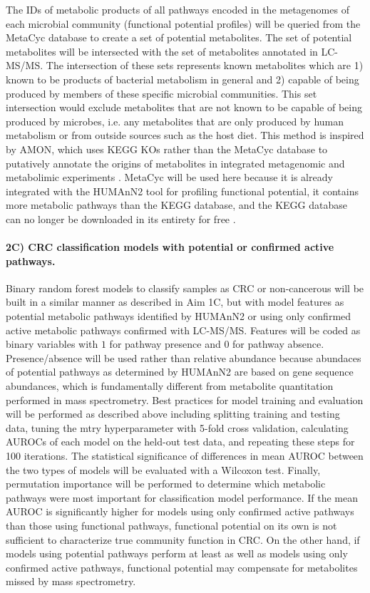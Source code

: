 \documentclass[11pt]{article}
\begin{document}
The IDs of metabolic products of all pathways encoded in the metagenomes of each microbial community (functional potential profiles) will be queried from the MetaCyc database to create a set of potential metabolites.
The set of potential metabolites will be intersected with the set of metabolites annotated in LC-MS/MS.
The intersection of these sets represents known metabolites which are 1) known to be products of bacterial metabolism in general and 2) capable of being produced by members of these specific microbial communities.
This set intersection would exclude metabolites that are not known to be capable of being produced by microbes, i.e. any metabolites that are only produced by human metabolism or from outside sources such as the host diet.
This method is inspired by AMON, which uses KEGG KOs rather than the MetaCyc database to putatively annotate the origins of metabolites in integrated metagenomic and metabolimic experiments \cite{shaffer_amon_2019}.
MetaCyc will be used here because it is already integrated with the HUMAnN2 tool for profiling functional potential,
it contains more metabolic pathways than the KEGG database,
and the KEGG database can no longer be downloaded in its entirety for free \cite{caspi_metacyc_2020}.

\paragraph{2C) CRC classification models with potential or confirmed active pathways.}

Binary random forest models to classify samples as CRC or non-cancerous will be built in a similar manner as described in Aim 1C, but with model features as potential metabolic pathways identified by HUMAnN2 or using only confirmed active metabolic pathways confirmed with LC-MS/MS.
Features will be coded as binary variables with $1$ for pathway presence and $0$ for pathway absence.
Presence/absence will be used rather than relative abundance because abundaces of potential pathways as determined by HUMAnN2 are based on gene sequence abundances, which is fundamentally different from metabolite quantitation performed in mass spectrometry.
Best practices for model training and evaluation will be performed as described above including splitting training and testing data, tuning the mtry hyperparameter with 5-fold cross validation, calculating AUROCs of each model on the held-out test data, and repeating these steps for 100 iterations.
The statistical significance of differences in mean AUROC between the two types of models will be evaluated with a Wilcoxon test.
Finally, permutation importance will be performed to determine which metabolic pathways were most important for classification model performance.
If the mean AUROC is significantly higher for models using only confirmed active pathways than those using functional pathways,
functional potential on its own is not sufficient to characterize true community function in CRC.
On the other hand, if models using potential pathways perform at least as well as models using only confirmed active pathways,
functional potential may compensate for metabolites missed by mass spectrometry.
\end{document}
